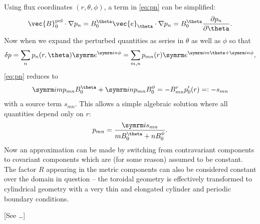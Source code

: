 Using flux coordinates $(r, \theta, \phi)$, a term in \cref{eq:pn} can be simplified:
\begin{gather}
  \vec{B}_{0}^{\pol} \cdot \grad p_{n} = B_{0}^{\theta} \vec{e}_{\theta} \cdot \grad p_{n} = B_{0}^{\theta} \pd[p_{n}]{\theta}.
\end{gather}
Now when we expand the perturbed quantities as series in $\theta$ as well as $\phi$ so that
\begin{gather}
  \delta p = \sum_{n} p_n(r, \theta) \e^{\im n \phi} = \sum_{m, n} p_{mn}(r) \e^{\im m \theta + \im n \phi},
\end{gather}
\cref{eq:pn} reduces to
\begin{gather}
  \im m p_{mn} B_{0}^{\theta} + \im n p_{mn} B_{0}^{\phi} = -B_{mn}^{r} p_{0}'(r) =: -s_{mn}
\end{gather}
with a source term $s_{mn}$. This allows a simple algebraic solution where all quantities depend only on $r$:
\begin{gather}
  p_{mn} =  \frac{\im s_{mn}}{m B_{0}^{\theta} + n B_{0}^{\phi}}.
\end{gather}
Now an approximation can be made by switching from contravariant components to covariant components which are (for some reason) assumed to be constant. The factor $R$ appearing in the metric components can also be considered constant over the domain in question -- the toroidal geometry is effectively transformed to cylindrical geometry with a very thin and elongated cylinder and periodic boundary conditions.

[See \cite{Heyn08} \ldots]

